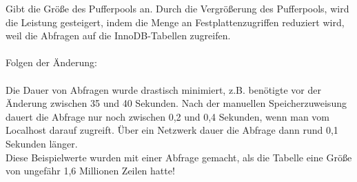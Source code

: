 Gibt die Größe des Pufferpools an. Durch die Vergrößerung des Pufferpools, wird die Leistung gesteigert, indem die Menge an Festplattenzugriffen reduziert wird, weil die Abfragen auf die InnoDB-Tabellen zugreifen.
\\\\
Folgen der Änderung:
\\\\
Die Dauer von Abfragen wurde drastisch minimiert, z.B.  benötigte vor der Änderung zwischen 35 und 40 Sekunden. Nach der manuellen Speicherzuweisung dauert die Abfrage nur noch zwischen 0,2 und 0,4 Sekunden, wenn man vom Localhost darauf zugreift. Über ein Netzwerk dauer die Abfrage dann rund 0,1 Sekunden länger.
\\
Diese Beispielwerte wurden mit einer Abfrage gemacht, als die Tabelle eine Größe von ungefähr 1,6 Millionen Zeilen hatte!
